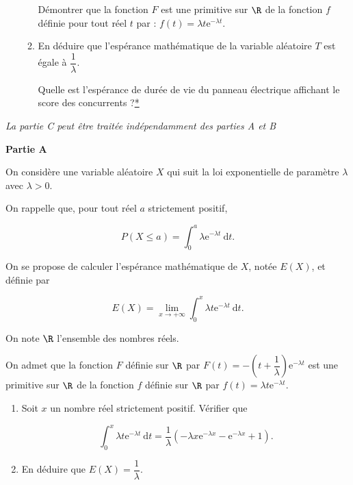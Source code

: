 \documentclass[12pt,frenchb]{article}
\begin{document}
\begin{question}[subtitle={Asie 2015}]
\begin{enumerate}
\begin{enumerate}
Démontrer que la fonction $F$ est une primitive sur $\R$ de la fonction $f$ définie pour tout
réel $t$ par : $f(t) = \lambda t\text{e}^{- \lambda t}$.
		\item En déduire que l'espérance mathématique de la variable aléatoire $T$ est égale à $\dfrac{1}{\lambda}$.
		
Quelle est l'espérance de durée de vie du panneau électrique affichant le score des
concurrents ?\hyperlink{Index}{*}
	\end{enumerate}
\end{enumerate}

\end{question}

\begin{question}[subtitle={Antilles Guyane 2015}]
\emph{La partie C peut être traitée indépendamment des parties A et B}

\bigskip

\textbf{Partie A}

\medskip

On considère une variable aléatoire $X$ qui suit la loi exponentielle de paramètre $\lambda$ avec $\lambda > 0$.

On rappelle que, pour tout réel $a$ strictement positif,

\[P(X \leqslant  a) = \displaystyle\int_0^a \lambda\text{e}^{- \lambda t}\:\text{d}t.\]

On se propose de calculer l'espérance mathématique de $X$, notée $E(X)$, et définie par

\[E(X) = \displaystyle\lim_{x \to + \infty} \int_0^x \lambda t \text{e}^{- \lambda t}\:\text{d}t.\]

On note $\R$ l'ensemble des nombres réels.

On admet que la fonction $F$ définie sur $\R$ par $F(t) = - \left(t + \dfrac{1}{\lambda}\right)\text{e}^{- \lambda t}$ est une primitive sur $\R$ de la fonction $f$ définie sur $\R$ par $f(t) = \lambda t \text{e}^{- \lambda t}$.

\medskip

\begin{enumerate}
\item Soit $x$ un nombre réel strictement positif. Vérifier que

\[\displaystyle \int_0^x \lambda t \text{e}^{- \lambda t}\:\text{d}t = \dfrac{1}{\lambda}\left(- \lambda x \text{e}^{- \lambda x} -  \text{e}^{- \lambda x} + 1\right).\]

\item  En déduire que $E(X) = \dfrac{1}{\lambda}$.
\end{enumerate}


\end{question}
\end{document}

